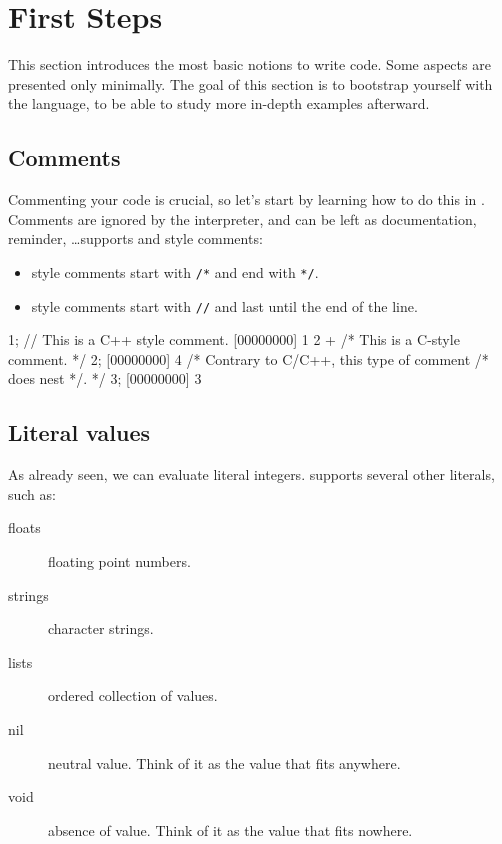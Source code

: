 \chapter{First Steps}
\label{sec:tut:first}
This section introduces the most basic notions to write \us code. Some
aspects are presented only minimally.  The goal of this section is to
bootstrap yourself with the \us language, to be able to study more
in-depth examples afterward.

\section{Comments}

Commenting your code is crucial, so let's start by learning how to do
this in \us. Comments are ignored by the interpreter, and
can be left as documentation, reminder, \ldots \us supports \C and
\Cxx style comments:

\begin{itemize}
\item \C style comments start with \texttt{/*} and end with \texttt{*/}.
\item \Cxx style comments start with \texttt{//} and last until the
  end of the line.
\end{itemize}

\begin{urbiscript}[firstnumber=1]
1; // This is a C++ style comment.
[00000000] 1
2 + /* This is a C-style comment. */ 2;
[00000000] 4
/* Contrary to C/C++, this type of comment /* does nest */. */
3;
[00000000] 3
\end{urbiscript}


\section{Literal values}

As already seen, we can evaluate literal integers. \us supports
several other literals, such as:

\begin{description}
\item[floats] floating point numbers.
\item[strings] character strings.
\item[lists] ordered collection of values.
\item[nil] neutral value. Think of it as the value that fits anywhere.
\item[void] absence of value. Think of it as the value that fits nowhere.
\end{description}

